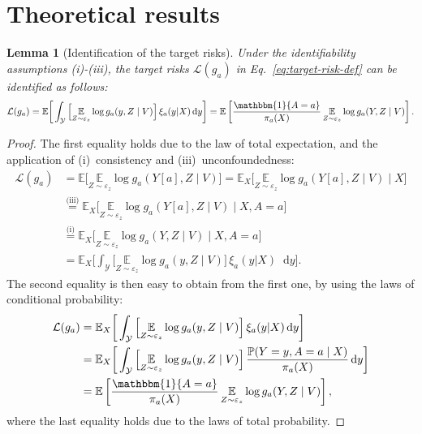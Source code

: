 \documentclass[dvipsnames]{article} %
\newcommand*\diff{\mathop{}\!\mathrm{d}}
\newtheorem{lemma}{Lemma}
\begin{document}
\section{{Theoretical results}} \label{app:proofs}
\begin{lemma}[Identification of the target risks] \label{lemma:target-risks-id}
    Under the identifiability assumptions (i)-(iii), the target risks $\mathcal{L}(g_a)$ in Eq.~\eqref{eq:target-risk-def} can be identified as follows:
    \begin{equation}
        \mathcal{L}(g_a)= \mathbb{E} \bigg[ \int_\mathcal{Y} \Big[\underset{Z \sim \varepsilon_z }{\mathbb{E}} \log g_a(y, Z \mid V) \Big] \, \xi_a(y | X) \diff{y} \bigg] = \mathbb{E}\left[\frac{\mathbbm{1}\{A = a\}}{\pi_a(X)} \, \underset{Z \sim \varepsilon_z }{\mathbb{E}} \log g_a(Y, Z \mid V)\right].
    \end{equation}
\end{lemma}
\begin{proof}
    The first equality holds due to the law of total expectation, and the application of (i)~consistency and (iii)~unconfoundedness:
    \begin{align}
         \mathcal{L}(g_a) &= \mathbb{E} \big[ \underset{Z \sim \varepsilon_z }{\mathbb{E}}\log g_a(Y[a], Z \mid V) \big]  = \mathbb{E}_X \big[ \underset{Z \sim \varepsilon_z }{\mathbb{E}}\log g_a(Y[a], Z \mid V) \mid X\big] \\
         & \stackrel{\text{(iii)}}{=} \mathbb{E}_X \big[ \underset{Z \sim \varepsilon_z }{\mathbb{E}}\log g_a(Y[a], Z \mid V) \mid X, A = a\big] \\
         & \stackrel{\text{(i)}}{=} \mathbb{E}_X \big[ \underset{Z \sim \varepsilon_z }{\mathbb{E}}\log g_a(Y, Z \mid V) \mid X, A = a\big] \\
         & = \mathbb{E}_X \bigg[ \int_\mathcal{Y} \Big[\underset{Z \sim \varepsilon_z }{\mathbb{E}} \log g_a(y, Z \mid V) \Big] \, \xi_a(y | X) \diff{y} \bigg].
    \end{align}
    The second equality is then easy to obtain from the first one, by using the laws of conditional probability:
    \begin{align}
        \mathcal{L}(g_a) &= \mathbb{E}_X \bigg[ \int_\mathcal{Y} \Big[\underset{Z \sim \varepsilon_z }{\mathbb{E}} \log g_a(y, Z \mid V) \Big] \, \xi_a(y | X) \diff{y} \bigg] \\
        & = \mathbb{E}_X \bigg[ \int_\mathcal{Y} \Big[\underset{Z \sim \varepsilon_z }{\mathbb{E}} \log g_a(y, Z \mid V) \Big] \, \frac{\mathbb{P}(Y=y, A =a \mid X)}{\pi_a(X)} \diff{y} \bigg] \\
        & = \mathbb{E}\left[\frac{\mathbbm{1}\{A = a\}}{\pi_a(X)} \, \underset{Z \sim \varepsilon_z }{\mathbb{E}} \log g_a(Y, Z \mid V)\right],
    \end{align}
    where the last equality holds due to the laws of total probability.
\end{proof}
\end{document}
